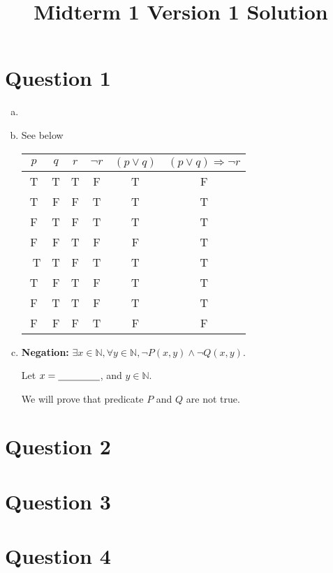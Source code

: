 \documentclass[12pt]{article}
\begin{document}
\title{Midterm 1 Version 1 Solution}
\maketitle

\section*{Question 1}
\begin{enumerate}[a.]
    \item

    \item

    See below

    \begin{tabular}{c|c|c|c|c|c}
        $p$ & $q$ & $r$ & $\neg r$ & $(p \lor q)$ & $(p \lor q) \Rightarrow \neg r$\\
        \hline
        T & T & T & F & T & F\\
        \hline
        T & F & F & T & T & T\\
        \hline
        F & T & F & T & T & T\\
        \hline
        F & F & T & F & F & T\\
        \
        T & T & F & T & T & T\\
        \hline
        T & F & T & F & T & T\\
        \hline
        F & T & T & F & T & T\\
        \hline
        F & F & F & T & F & F
    \end{tabular}

    \item

    \textbf{Negation:} $\exists x \in \mathbb{N}, \forall y \in \mathbb{N}, \neg
    P(x,y) \land \neg Q(x,y)$.

    \bigskip

    Let $x = \underline{\hspace{1.5cm}}$, and $y \in \mathbb{N}$.

    \bigskip

    We will prove that predicate $P$ and $Q$ are not true.

\end{enumerate}

\section*{Question 2}

\section*{Question 3}

\section*{Question 4}
\end{document}

